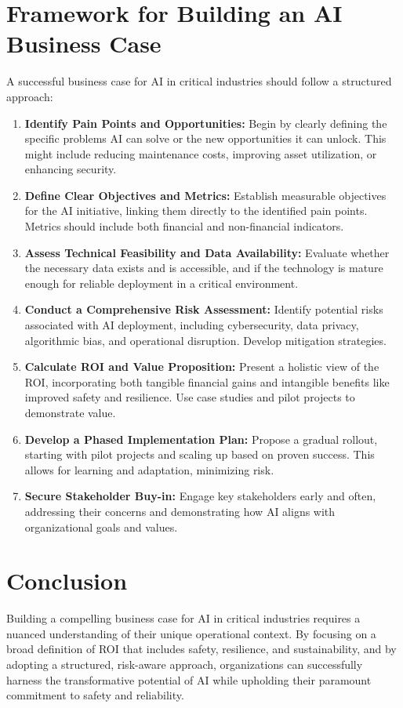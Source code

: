 \section{Framework for Building an AI Business Case}
A successful business case for AI in critical industries should follow a structured approach:
\begin{enumerate}
    \item \textbf{Identify Pain Points and Opportunities:} Begin by clearly defining the specific problems AI can solve or the new opportunities it can unlock. This might include reducing maintenance costs, improving asset utilization, or enhancing security.
    \item \textbf{Define Clear Objectives and Metrics:} Establish measurable objectives for the AI initiative, linking them directly to the identified pain points. Metrics should include both financial and non-financial indicators.
    \item \textbf{Assess Technical Feasibility and Data Availability:} Evaluate whether the necessary data exists and is accessible, and if the technology is mature enough for reliable deployment in a critical environment.
    \item \textbf{Conduct a Comprehensive Risk Assessment:} Identify potential risks associated with AI deployment, including cybersecurity, data privacy, algorithmic bias, and operational disruption. Develop mitigation strategies.
    \item \textbf{Calculate ROI and Value Proposition:} Present a holistic view of the ROI, incorporating both tangible financial gains and intangible benefits like improved safety and resilience. Use case studies and pilot projects to demonstrate value.
    \item \textbf{Develop a Phased Implementation Plan:} Propose a gradual rollout, starting with pilot projects and scaling up based on proven success. This allows for learning and adaptation, minimizing risk.
    \item \textbf{Secure Stakeholder Buy-in:} Engage key stakeholders early and often, addressing their concerns and demonstrating how AI aligns with organizational goals and values.
\end{enumerate}

\section{Conclusion}
Building a compelling business case for AI in critical industries requires a nuanced understanding of their unique operational context. By focusing on a broad definition of ROI that includes safety, resilience, and sustainability, and by adopting a structured, risk-aware approach, organizations can successfully harness the transformative potential of AI while upholding their paramount commitment to safety and reliability.
